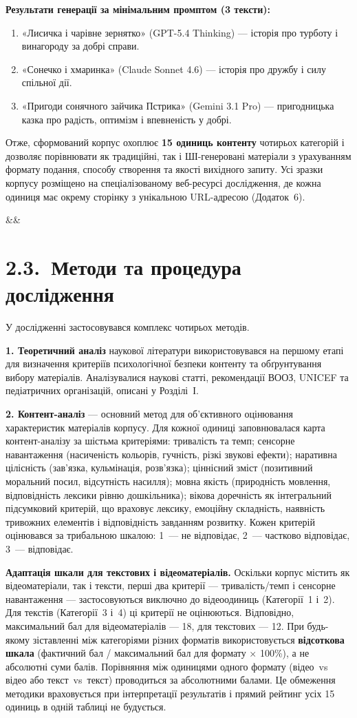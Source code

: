 \documentclass[14pt, a4paper]{extreport}
\newcommand{\mysection}[3][]{%
  \ifx&#1&\newpage\fi
  \section*{#2.~#3}%
  \phantomsection
  \addcontentsline{toc}{section}{#2.~#3}%
}
\begin{document}
\textbf{Результати генерації за мінімальним промптом (3 тексти):}
\begin{enumerate}
  \item «Лисичка і чарівне зернятко» (GPT-5.4 Thinking) --- історія про турботу і винагороду за добрі справи.
  \item «Сонечко і хмаринка» (Claude Sonnet 4.6) --- історія про дружбу і силу спільної дії.
  \item «Пригоди сонячного зайчика Пстрика» (Gemini 3.1 Pro) --- пригодницька казка про радість, оптимізм і впевненість у добрі.
\end{enumerate}

\medskip
Отже, сформований корпус охоплює \textbf{15 одиниць контенту} чотирьох категорій і дозволяє порівнювати як традиційні, так і ШІ-генеровані матеріали з урахуванням формату подання, способу створення та якості вихідного запиту. Усі зразки корпусу розміщено на спеціалізованому веб-ресурсі дослідження, де кожна одиниця має окрему сторінку з унікальною URL-адресою (Додаток~6).

\mysection{2.3}{Методи та процедура дослідження}

У дослідженні застосовувався комплекс чотирьох методів.

\textbf{1. Теоретичний аналіз} наукової літератури використовувався на першому етапі для визначення критеріїв психологічної безпеки контенту та обґрунтування вибору матеріалів. Аналізувалися наукові статті, рекомендації ВООЗ, UNICEF та педіатричних організацій, описані у Розділі~І.

\textbf{2. Контент-аналіз} --- основний метод для об'єктивного оцінювання характеристик матеріалів корпусу. Для кожної одиниці заповнювалася карта контент-аналізу за шістьма критеріями: тривалість та темп; сенсорне навантаження (насиченість кольорів, гучність, різкі звукові ефекти); наративна цілісність (зав'язка, кульмінація, розв'язка); ціннісний зміст (позитивний моральний посил, відсутність насилля); мовна якість (природність мовлення, відповідність лексики рівню дошкільника); вікова доречність як інтегральний підсумковий критерій, що враховує лексику, емоційну складність, наявність тривожних елементів і відповідність завданням розвитку. Кожен критерій оцінювався за трибальною шкалою: 1~--- не відповідає, 2~--- частково відповідає, 3~--- відповідає.

\textbf{Адаптація шкали для текстових і відеоматеріалів.}
Оскільки корпус містить як відеоматеріали, так і тексти, перші два критерії --- тривалість/темп і сенсорне навантаження --- застосовуються виключно до відеоодиниць (Категорії~1 і~2). Для текстів (Категорії~3 і~4) ці критерії не оцінюються. Відповідно, максимальний бал для відеоматеріалів --- 18, для текстових --- 12. При будь-якому зіставленні між категоріями різних форматів використовується \textbf{відсоткова шкала} (фактичний бал / максимальний бал для формату × 100\%), а не абсолютні суми балів. Порівняння між одиницями одного формату (відео~vs відео або текст~vs~текст) проводиться за абсолютними балами. Це обмеження методики враховується при інтерпретації результатів і прямий рейтинг усіх 15 одиниць в одній таблиці не будується.
\end{document}
